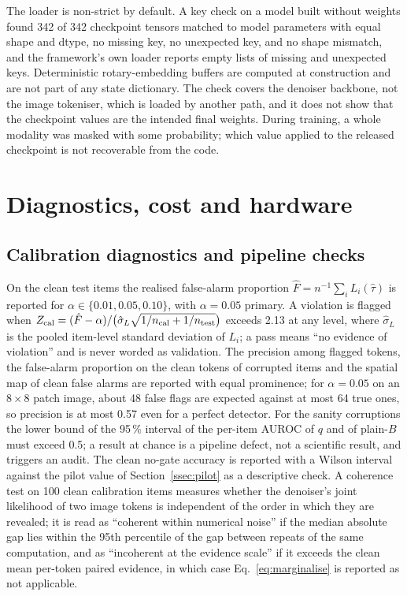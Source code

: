 The loader is non-strict by default.
A key check on a model built without weights found 342 of 342 checkpoint tensors matched to model parameters with equal shape and
dtype, no missing key, no unexpected key, and no shape mismatch, and the framework's own loader reports empty lists of missing and
unexpected keys.
Deterministic rotary-embedding buffers are computed at construction and are not part of any state dictionary.
The check covers the denoiser backbone, not the image tokeniser, which is loaded by another path, and it does not show that the
checkpoint values are the intended final weights.
During training, a whole modality was masked with some probability; which value applied to the released checkpoint is not recoverable
from the code.

\section{Diagnostics, cost and hardware}\label{app:diag}
\subsection{Calibration diagnostics and pipeline checks}\label{app:diagchecks}
On the clean test items the realised false-alarm proportion $\hat F=n^{-1}\sum_i L_i(\hat\tau)$ is reported for
$\alpha\in\{0.01,0.05,0.10\}$, with $\alpha=0.05$ primary.
A violation is flagged when $Z_{\rm cal}=(\hat F-\alpha)/\big(\hat\sigma_L\sqrt{1/n_{\rm cal}+1/n_{\rm test}}\big)$ exceeds 2.13 at any
level, where $\hat\sigma_L$ is the pooled item-level standard deviation of $L_i$; a pass means ``no evidence of violation'' and is
never worded as validation.
The precision among flagged tokens, the false-alarm proportion on the clean tokens of corrupted items and the spatial map of clean
false alarms are reported with equal prominence; for $\alpha=0.05$ on an $8\times8$ patch image, about 48 false flags are expected
against at most 64 true ones, so precision is at most 0.57 even for a perfect detector.
For the sanity corruptions the lower bound of the 95\,\% interval of the per-item AUROC of $q$ and of plain-$B$ must exceed 0.5; a
result at chance is a pipeline defect, not a scientific result, and triggers an audit.
The clean no-gate accuracy is reported with a Wilson interval against the pilot value of Section~\ref{ssec:pilot} as a descriptive
check.
A coherence test on 100 clean calibration items measures whether the denoiser's joint likelihood of two image tokens is independent
of the order in which they are revealed; it is read as ``coherent within numerical noise'' if the median absolute gap lies within the
95th percentile of the gap between repeats of the same computation, and as ``incoherent at the evidence scale'' if it exceeds the
clean mean per-token paired evidence, in which case Eq.~\eqref{eq:marginalise} is reported as not applicable.

